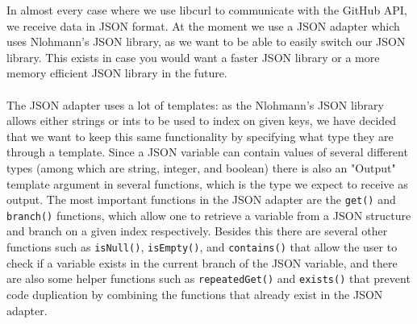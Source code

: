 \documentclass[../Main.tex]{subfiles}
\begin{document}
In almost every case where we use libcurl to communicate with the GitHub API, we receive data in JSON format. At the moment we use a JSON adapter which uses Nlohmann's JSON library, as we want to be able to easily switch our JSON library. This exists in case you would want a faster JSON library or a more memory efficient JSON library in the future.
\\
\\
The JSON adapter uses a lot of templates: as the Nlohmann's JSON library allows either strings or ints to be used to index on given keys, we have decided that we want to keep this same functionality by specifying what type they are through a template. Since a JSON variable can contain values of several different types (among which are string, integer, and boolean) there is also an "Output" template argument in several functions, which is the type we expect to receive as output. The most important functions in the JSON adapter are the \texttt{get()} and \texttt{branch()} functions, which allow one to retrieve a variable from a JSON structure and branch on a given index respectively. Besides this there are several other functions such as \texttt{isNull()}, \texttt{isEmpty()}, and \texttt{contains()} that allow the user to check if a variable exists in the current branch of the JSON variable, and there are also some helper functions such as \texttt{repeatedGet()} and \texttt{exists()} that prevent code duplication by combining the functions that already exist in the JSON adapter.
\end{document}
